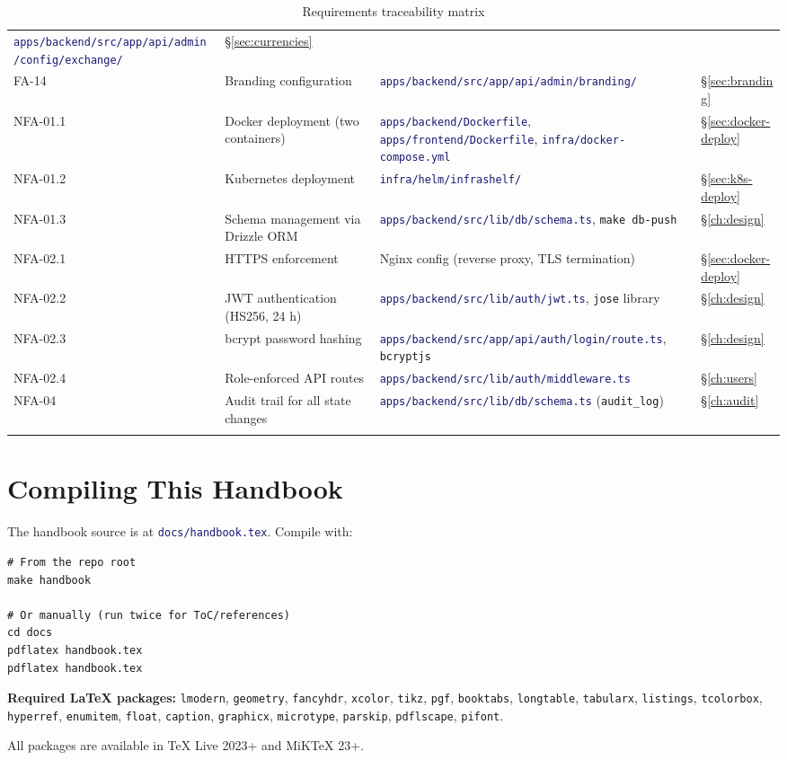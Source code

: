 \documentclass[12pt,a4paper,twoside]{report}
\newcommand{\code}[1]{\texttt{#1}}
\newcommand{\file}[1]{\texttt{\textcolor{MidnightBlue}{#1}}}
\begin{document}
\begin{landscape}
\begin{longtable}{@{}lL{5.5cm}L{9.0cm}l@{}}
    \file{apps/backend/src/app/api/admin/config/exchange/} &
    \S\ref{sec:currencies} \\
  FA-14 & Branding configuration &
    \file{apps/backend/src/app/api/admin/branding/} &
    \S\ref{sec:branding} \\
  \midrule
  NFA-01.1 & Docker deployment (two containers) &
    \file{apps/backend/Dockerfile}, \file{apps/frontend/Dockerfile},
    \file{infra/docker-compose.yml} &
    \S\ref{sec:docker-deploy} \\
  NFA-01.2 & Kubernetes deployment &
    \file{infra/helm/infrashelf/} &
    \S\ref{sec:k8s-deploy} \\
  NFA-01.3 & Schema management via Drizzle ORM &
    \file{apps/backend/src/lib/db/schema.ts}, \code{make db-push} &
    \S\ref{ch:design} \\
  NFA-02.1 & HTTPS enforcement &
    Nginx config (reverse proxy, TLS termination) &
    \S\ref{sec:docker-deploy} \\
  NFA-02.2 & JWT authentication (HS256, 24 h) &
    \file{apps/backend/src/lib/auth/jwt.ts}, \code{jose} library &
    \S\ref{ch:design} \\
  NFA-02.3 & bcrypt password hashing &
    \file{apps/backend/src/app/api/auth/login/route.ts}, \code{bcryptjs} &
    \S\ref{ch:design} \\
  NFA-02.4 & Role-enforced API routes &
    \file{apps/backend/src/lib/auth/middleware.ts} &
    \S\ref{ch:users} \\
  NFA-04 & Audit trail for all state changes &
    \file{apps/backend/src/lib/db/schema.ts} (\code{audit\_log}) &
    \S\ref{ch:audit} \\
  \bottomrule
  \caption{Requirements traceability matrix}
  \label{tab:rtm}
\end{longtable}
\end{landscape}

\chapter{Compiling This Handbook}
\label{app:compile}

The handbook source is at \file{docs/handbook.tex}. Compile with:

\begin{lstlisting}[style=bash]
# From the repo root
make handbook

# Or manually (run twice for ToC/references)
cd docs
pdflatex handbook.tex
pdflatex handbook.tex
\end{lstlisting}

\textbf{Required LaTeX packages:} \code{lmodern}, \code{geometry},
\code{fancyhdr}, \code{xcolor}, \code{tikz}, \code{pgf},
\code{booktabs}, \code{longtable}, \code{tabularx}, \code{listings},
\code{tcolorbox}, \code{hyperref}, \code{enumitem}, \code{float},
\code{caption}, \code{graphicx}, \code{microtype}, \code{parskip},
\code{pdflscape}, \code{pifont}.

All packages are available in TeX Live 2023+ and MiKTeX 23+.
\end{document}
